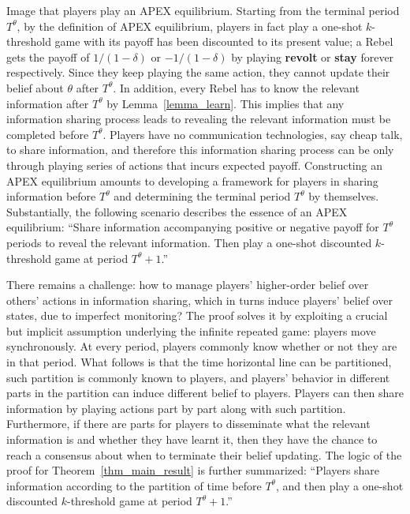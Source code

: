 \documentclass[12pt,letter]{article}
\theoremstyle{definition}
\theoremstyle{remark}
\theoremstyle{claim}
\begin{document}
Image that players play an APEX equilibrium. Starting from the terminal period $T^{\theta}$, by the definition of APEX equilibrium, players in fact play a one-shot $k$-threshold game with its payoff has been discounted to its present value; a Rebel gets the payoff of $1/(1-\delta)$ or $-1/(1-\delta)$ by playing \textbf{revolt} or \textbf{stay} forever respectively. Since they keep playing the same action, they cannot update their belief about $\theta$ after $T^{\theta}$. In addition, every Rebel has to know the relevant information after $T^{\theta}$ by Lemma~\ref{lemma_learn}. This implies that any information sharing process leads to revealing the relevant information must be completed before $T^{\theta}$.  Players have no communication technologies, say cheap talk, to share information, and therefore this information sharing process can be only through playing series of actions that incurs expected payoff. Constructing an APEX equilibrium amounts to developing a framework for players in sharing information before $T^{\theta}$ and determining the terminal period $T^{\theta}$ by themselves. Substantially, the following scenario describes the essence of an APEX equilibrium: ``{Share information accompanying positive or negative payoff  for $T^{\theta}$ periods to reveal the relevant information. Then play a one-shot discounted $k$-threshold game at period $T^{\theta}+1$.}''

There remains a challenge: how to manage players' higher-order belief over others' actions in information sharing, which in turns induce players' belief over states, due to imperfect monitoring? The proof solves it by exploiting a crucial but implicit assumption underlying the infinite repeated game: players move synchronously. At every period, players commonly know whether or not they are in that period. What follows is that the time horizontal line can be partitioned, such partition is commonly known to players, and players' behavior in different parts in the partition can induce different belief to players. Players can then share information by playing actions part by part along with such partition. Furthermore, if there are parts for players to disseminate what the relevant information is and whether they have learnt it, then they have the chance to reach a consensus about when to terminate their belief updating. The logic of the proof for Theorem~\ref{thm_main_result} is further summarized: ``Players share information according to the partition of time before $T^{\theta}$, and then play a one-shot discounted $k$-threshold game at period $T^{\theta}+1$.''
\end{document}
